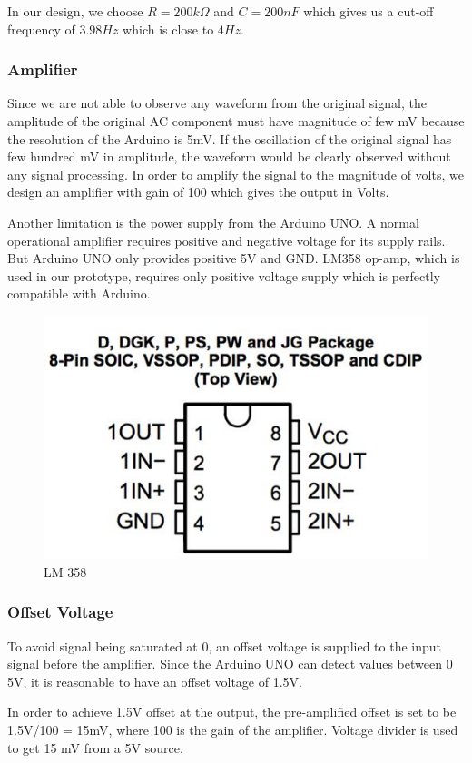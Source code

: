 In our design, we choose $R = 200k \Omega$ and $C = 200nF$ which gives us a cut-off frequency of $3.98 Hz$ which is close to $4 Hz$.

\subsubsection{Amplifier}

Since we are not able to observe any waveform from the original signal, the amplitude of the original AC component must have magnitude of few mV because the resolution of the Arduino is 5mV. If the oscillation of the original signal has few hundred mV in amplitude, the waveform would be clearly observed without any signal processing. In order to amplify the signal to the magnitude of volts, we design an amplifier with gain of 100 which gives the output in Volts. 

Another limitation is the power supply from the Arduino UNO. A normal operational amplifier requires positive and negative voltage for its supply rails. But Arduino UNO only provides positive 5V and GND. LM358 op-amp, which is used in our prototype, requires only positive voltage supply which is perfectly compatible with Arduino.

\begin{figure}[H]
	\centering
	\includegraphics[width=0.4\linewidth]{georgepic5.jpg}
	\caption{LM 358 \cite{george12}}
\end{figure}

\subsubsection{Offset Voltage}

To avoid signal being saturated at 0, an offset voltage is supplied to the input signal before the amplifier. Since the Arduino UNO can detect values between 0 ~ 5V, it is reasonable to have an offset voltage of 1.5V. 

In order to achieve 1.5V offset at the output, the pre-amplified offset is set to be 1.5V/100 = 15mV, where 100 is the gain of the amplifier. Voltage divider is used to get 15 mV from a 5V source.

